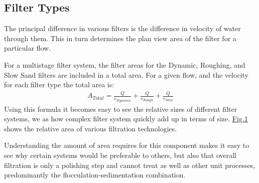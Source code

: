 \documentclass[letterpaper,10pt,english]{sphinxmanual}
\begin{document}
\subsection{Filter Types}
\label{\detokenize{Filtration/Filtration_Design:filter-types}}\label{\detokenize{Filtration/Filtration_Design:heading-filter-types}}
The principal difference in various filters is the difference in velocity of water through them. This in turn determines the plan view area of the filter for a particular flow.

For a multistage filter system, the filter areas for the Dynamic, Roughing, and Slow Sand filters are included in a total area. For a given flow, and the velocity for each filter type the total area is:
\begin{equation}\label{equation:Filtration/Filtration_Design:area_stuff}
\begin{split} A_{Total} = \frac{Q}{v_{Dynamic}} + \frac{Q}{v_{Rough}} + \frac{Q}{v_{Slow}}\end{split}
\end{equation}
Using this formula it becomes easy to see the relative sizes of different filter systems, we as how complex filter system quickly add up in terms of size. \hyperref[\detokenize{Filtration/Filtration_Design:figure-relative-area-of-filtration}]{Fig.\@ \ref{\detokenize{Filtration/Filtration_Design:figure-relative-area-of-filtration}}} shows the relative area of various filtration technologies.

\begin{figure}[htbp]
\centering

\noindent{}
\label{\detokenize{Filtration/Filtration_Design:figure-relative-area-of-filtration}}\end{figure}

Understanding the amount of area requires for this component makes it easy to see why certain systems would be preferable to others, but also that overall filtration is only a polishing step and cannot treat as well as other unit processes, predominantly the flocculation-sedimentation combination.
\end{document}
